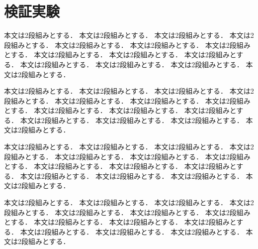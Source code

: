 \documentclass[../main]{subfiles}
\begin{document}
\graphicspath{{../figures/}}

\section{検証実験}
本文は2段組みとする．
本文は2段組みとする．
本文は2段組みとする．
本文は2段組みとする．
本文は2段組みとする．
本文は2段組みとする．
本文は2段組みとする．
本文は2段組みとする．
本文は2段組みとする．
本文は2段組みとする．
本文は2段組みとする．
本文は2段組みとする．
本文は2段組みとする．
本文は2段組みとする．

本文は2段組みとする．
本文は2段組みとする．
本文は2段組みとする．
本文は2段組みとする．
本文は2段組みとする．
本文は2段組みとする．
本文は2段組みとする．
本文は2段組みとする．
本文は2段組みとする．
本文は2段組みとする．
本文は2段組みとする．
本文は2段組みとする．
本文は2段組みとする．
本文は2段組みとする．

本文は2段組みとする．
本文は2段組みとする．
本文は2段組みとする．
本文は2段組みとする．
本文は2段組みとする．
本文は2段組みとする．
本文は2段組みとする．
本文は2段組みとする．
本文は2段組みとする．
本文は2段組みとする．
本文は2段組みとする．
本文は2段組みとする．
本文は2段組みとする．
本文は2段組みとする．

本文は2段組みとする．
本文は2段組みとする．
本文は2段組みとする．
本文は2段組みとする．
本文は2段組みとする．
本文は2段組みとする．
本文は2段組みとする．
本文は2段組みとする．
本文は2段組みとする．
本文は2段組みとする．
本文は2段組みとする．
本文は2段組みとする．
本文は2段組みとする．
本文は2段組みとする．
\end{document}
